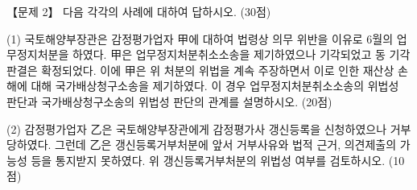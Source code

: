 \begin{longquestion}{【문제 2】}
다음 각각의 사례에 대하여 답하시오. (30점) \par
\medskip\noindent (1) 국토해양부장관은 감정평가업자 甲에 대하여 법령상 의무 위반을 이유로 6월의 업무정지처분을 하였다. 甲은 업무정지처분취소소송을 제기하였으나 기각되었고 동 기각판결은 확정되었다. 이에 甲은 위 처분의 위법을 계속 주장하면서 이로 인한 재산상 손해에 대해 국가배상청구소송을 제기하였다. 이 경우 업무정지처분취소소송의 위법성 판단과 국가배상청구소송의 위법성 판단의 관계를 설명하시오. (20점) \par
\medskip\noindent (2) 감정평가업자 乙은 국토해양부장관에게 감정평가사 갱신등록을 신청하였으나 거부당하였다. 그런데 乙은 갱신등록거부처분에 앞서 거부사유와 법적 근거, 의견제출의 가능성 등을 통지받지 못하였다. 위 갱신등록거부처분의 위법성 여부를 검토하시오. (10점) \par
\end{longquestion}
